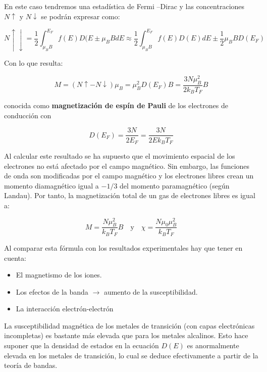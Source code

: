En este caso tendremos una estadística de Fermi –Dirac y las concentraciones $N\uparrow$ y $N\downarrow$ se podrán expresar como:

\begin{equation}
  N\uparrow\downarrow = \frac{1}{2} \int_{\mu_{B}B}^{E_{F}} f(E)D(E\pm \mu_{B}B dE \approx 
            \frac{1}{2} \int_{\mu_{B}B}^{E_{F}} f(E)D(E) dE \pm \frac{1}{2}\mu_{B}B D(E_{F}) 
\end{equation}

Con lo que resulta:

\begin{equation}
  M = (N\uparrow-N\downarrow)\mu_{B} = \mu_{B}^{2}D(E_{F})B = \frac{3N\mu_{B}^{2}}{2k_{B}T_{F}}B
\end{equation}

conocida como \textbf{magnetización de espín de Pauli} de los electrones de conducción con

\begin{equation}
  D(E_{F}) = \frac{3N}{2E_{F}} = \frac{3N}{2Ek_{B}T_{F}} 
\end{equation}

Al calcular este resultado se ha supuesto que el movimiento espacial de los electrones no está afectado por el campo magnético. Sin embargo, las funciones de onda son modificadas por el campo magnético y los electrones libres crean un momento diamagnético igual a $-1/3$ del momento paramagnético (según Landau).
Por tanto, la magnetización total de un gas de electrones libres es igual a:

\begin{equation}
  M = \frac{N\mu_{B}^{2}}{k_{B}T_{F}}B \quad \text{y} \quad \chi=\frac{N\mu_{0}\mu_{B}^{2}}{k_{B}T_{F}} 
\end{equation}

Al comparar esta fórmula con los resultados experimentales hay que tener en cuenta:

\begin{itemize}
	\item El magnetismo de los iones.
	\item Los efectos de la banda $\rightarrow$ aumento de la susceptibilidad.
	\item La interacción electrón-electrón
\end{itemize}
La susceptibilidad magnética de los metales de transición (con capas electrónicas incompletas) es bastante más elevada que para los metales alcalinos. Esto hace suponer que la densidad de estados en la ecuación $D(E)$ es anormalmente elevada en los metales de transición, lo cual se deduce efectivamente a partir de la teoría de bandas.

